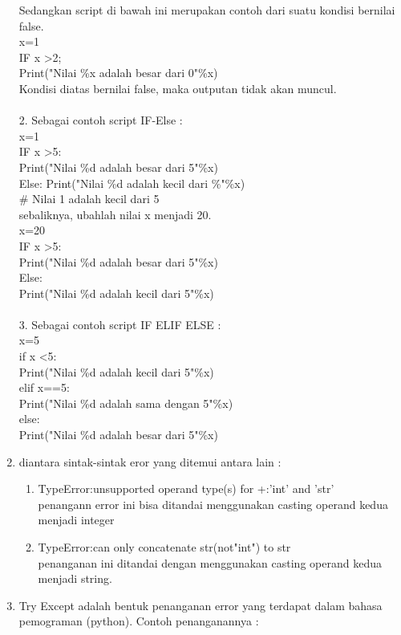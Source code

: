 \begin{enumerate}
Sedangkan script di bawah ini merupakan contoh dari suatu kondisi bernilai false. \\
x=1 \\
IF x >2; \\
Print("Nilai \%x adalah besar dari 0"\%x) \\
Kondisi diatas bernilai false, maka outputan tidak akan muncul.\\ \\
2. Sebagai contoh script IF-Else : \\
x=1 \\
IF x >5: \\
Print("Nilai \%d adalah besar dari 5"\%x) \\
Else:
Print("Nilai \%d adalah kecil dari \%"\%x) \\ 
\# Nilai 1 adalah kecil dari 5 \\ sebaliknya, ubahlah nilai x menjadi 20.\\
x=20 \\
IF x >5:\\
Print("Nilai \%d adalah besar dari 5"\%x)\\
Else: \\
Print("Nilai \%d adalah kecil dari 5"\%x)\\\\
3. Sebagai contoh script IF ELIF ELSE : \\
x=5\\
if x <5:\\
Print("Nilai \%d adalah kecil dari 5"\%x)\\
elif x==5:\\
Print("Nilai \%d adalah sama dengan 5"\%x)\\
else: \\
Print("Nilai \%d adalah besar dari 5"\%x)\\
\item
diantara sintak-sintak eror yang ditemui antara lain :
\begin{enumerate}
\item
TypeError:unsupported operand type(s) for +:'int' and 'str' \\ penangann error ini bisa ditandai menggunakan casting operand kedua menjadi integer
\item
TypeError:can only concatenate str(not"int") to str \\ penanganan ini ditandai dengan menggunakan casting operand kedua menjadi string. 
\end{enumerate}
\item
Try Except adalah bentuk penanganan error yang terdapat dalam bahasa pemograman (python). Contoh penanganannya : \\

\end{enumerate}
